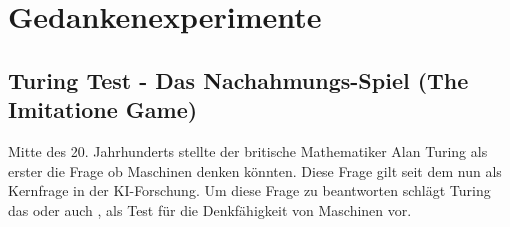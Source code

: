 \documentclass[a4paper,12pt,german,ngerman]{report}
\begin{document}
    \section{}
    \section{}

    \chapter{Gedankenexperimente}

    \section{Turing Test - Das Nachahmungs-Spiel (The Imitatione Game) }
    Mitte des 20. Jahrhunderts stellte der britische Mathematiker Alan Turing als erster die Frage ob Maschinen denken könnten.
    Diese Frage gilt seit dem nun als Kernfrage in der KI-Forschung. Um diese Frage zu beantworten schlägt Turing das
     oder auch , als Test für die Denkfähigkeit von Maschinen vor.

    \autocite{turing1950computing}
\end{document}
